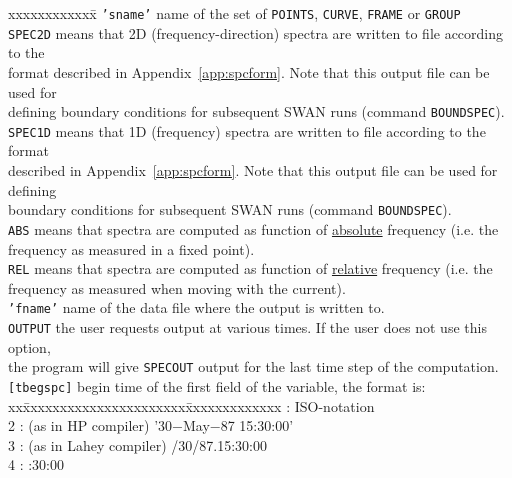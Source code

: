 \documentclass[12pt]{book}
\begin{document}
\begin{tabbing}
 xxxxxxxxxxxx\= \kill
{\tt {'sname'}} \> name of the set of {\tt POINTS}, {\tt CURVE}, {\tt FRAME} or {\tt GROUP}\\
{\tt SPEC2D}    \> means that 2D (frequency-direction) spectra are written to file according to the\+\\
                   format described in Appendix~\ref{app:spcform}. Note that this output file can be used for\\
                   defining boundary conditions for subsequent SWAN runs (command {\tt BOUNDSPEC}).\-\\
{\tt SPEC1D}    \> means that 1D (frequency) spectra are written to file according to the format\+\\
                   described in Appendix~\ref{app:spcform}. Note that this output file can be used for defining\\
                   boundary conditions for subsequent SWAN runs (command {\tt BOUNDSPEC}).\-\\
{\tt ABS}       \> means that spectra are computed as function of \underline{absolute} frequency (i.e. the\+\\
                   frequency as measured in a fixed point).\-\\
{\tt REL}       \> means that spectra are computed as function of \underline{relative} frequency (i.e. the\+\\
                   frequency as measured when moving with the current).\-\\
{\tt {'fname'}} \> name of the data file where the output is written to.\\
{\tt OUTPUT}    \> the user requests output at various times. If the user does not use this option,\+\\
                   the program will give {\tt SPECOUT} output for the last time step of the computation.\-\\
{\tt [tbegspc]} \> begin time of the first field of the variable, the format is:\+\\
                   \pushtabs
                   xx\=xxxxxxxxxxxxxxxxxxxxxx\=xxxxxxxxxxxxx  \>: ISO-notation                     \\
                   2 \>: (as in HP compiler)    \> '30$-$May$-$87 15:30:00' \\
                   3 \>: (as in Lahey compiler) /30/87.15:30:00        \\
                   4 \>:                        :30:00                 \\

\end{tabbing}
\end{document}
